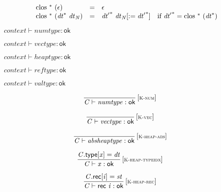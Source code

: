 $$
\begin{array}{@{}lcl@{}l@{}}
{\mathrm{clos}}~{}^\ast~(\epsilon) &=& \epsilon &  \\
{\mathrm{clos}}~{}^\ast~({{\mathit{dt}}^\ast}~{\mathit{dt}}_{{\mathit{N}}}) &=& {{\mathit{dt}'}^\ast}~{{\mathit{dt}}_{{\mathit{N}}}}{[{ := }\;{{\mathit{dt}'}^\ast}]} &\quad
  \mbox{if}~{{\mathit{dt}'}^\ast} = {\mathrm{clos}}~{}^\ast~({{\mathit{dt}}^\ast}) \\
\end{array}
$$

\vspace{1ex}

\vspace{1ex}

$\boxed{{\mathit{context}} \vdash {\mathit{numtype}} : \mathsf{ok}}$

$\boxed{{\mathit{context}} \vdash {\mathit{vectype}} : \mathsf{ok}}$

$\boxed{{\mathit{context}} \vdash {\mathit{heaptype}} : \mathsf{ok}}$

$\boxed{{\mathit{context}} \vdash {\mathit{reftype}} : \mathsf{ok}}$

$\boxed{{\mathit{context}} \vdash {\mathit{valtype}} : \mathsf{ok}}$

\vspace{1ex}

$$
\begin{array}{@{}c@{}}\displaystyle
\frac{
}{
{\mathit{C}} \vdash {\mathit{numtype}} : \mathsf{ok}
} \, {[\textsc{\scriptsize K{-}num}]}
\qquad
\end{array}
$$

$$
\begin{array}{@{}c@{}}\displaystyle
\frac{
}{
{\mathit{C}} \vdash {\mathit{vectype}} : \mathsf{ok}
} \, {[\textsc{\scriptsize K{-}vec}]}
\qquad
\end{array}
$$

$$
\begin{array}{@{}c@{}}\displaystyle
\frac{
}{
{\mathit{C}} \vdash {\mathit{absheaptype}} : \mathsf{ok}
} \, {[\textsc{\scriptsize K{-}heap{-}abs}]}
\qquad
\end{array}
$$

$$
\begin{array}{@{}c@{}}\displaystyle
\frac{
{\mathit{C}}.\mathsf{type}[{\mathit{x}}] = {\mathit{dt}}
}{
{\mathit{C}} \vdash {\mathit{x}} : \mathsf{ok}
} \, {[\textsc{\scriptsize K{-}heap{-}typeidx}]}
\qquad
\end{array}
$$

$$
\begin{array}{@{}c@{}}\displaystyle
\frac{
{\mathit{C}}.\mathsf{rec}[{\mathit{i}}] = {\mathit{st}}
}{
{\mathit{C}} \vdash \mathsf{rec}~{\mathit{i}} : \mathsf{ok}
} \, {[\textsc{\scriptsize K{-}heap{-}rec}]}
\qquad
\end{array}
$$

